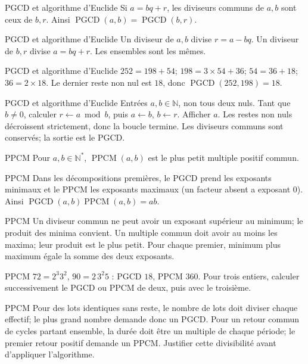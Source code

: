\documentclass[aspectratio=169,10pt]{beamer}
\begin{document}
\begin{frame}{PGCD et algorithme d’Euclide}
Si \(a=bq+r\), les diviseurs communs de \(a,b\) sont ceux de \(b,r\). Ainsi \(\operatorname{PGCD}(a,b)=\operatorname{PGCD}(b,r)\).
\end{frame}
\begin{frame}{PGCD et algorithme d’Euclide}
Un diviseur de \(a,b\) divise \(r=a-bq\). Un diviseur de \(b,r\) divise \(a=bq+r\). Les ensembles sont les mêmes.
\end{frame}
\begin{frame}{PGCD et algorithme d’Euclide}
\(252=198+54\); \(198=3\times54+36\); \(54=36+18\); \(36=2\times18\). Le dernier reste non nul est \(18\), donc \(\operatorname{PGCD}(252,198)=18\).
\end{frame}
\begin{frame}{PGCD et algorithme d’Euclide}
Entrées \(a,b\in\mathbb{N}\), non tous deux nuls. Tant que \(b\ne0\), calculer \(r\leftarrow a\bmod b\), puis \(a\leftarrow b\), \(b\leftarrow r\). Afficher \(a\). Les restes non nuls décroissent strictement, donc la boucle termine. Les diviseurs communs sont conservés; la sortie est le PGCD.
\end{frame}
\begin{frame}{PPCM}
Pour \(a,b\in\mathbb{N}^*\), \(\operatorname{PPCM}(a,b)\) est le plus petit multiple positif commun.
\end{frame}
\begin{frame}{PPCM}
Dans les décompositions premières, le PGCD prend les exposants minimaux et le PPCM les exposants maximaux (un facteur absent a exposant \(0\)). Ainsi \(\operatorname{PGCD}(a,b)\operatorname{PPCM}(a,b)=ab\).
\end{frame}
\begin{frame}{PPCM}
Un diviseur commun ne peut avoir un exposant supérieur au minimum; le produit des minima convient. Un multiple commun doit avoir au moins les maxima; leur produit est le plus petit. Pour chaque premier, minimum plus maximum égale la somme des deux exposants.
\end{frame}
\begin{frame}{PPCM}
\(72=2^3 3^2\), \(90=2\,3^2 5\) : PGCD \(18\), PPCM \(360\). Pour trois entiers, calculer successivement le PGCD ou PPCM de deux, puis avec le troisième.
\end{frame}
\begin{frame}{PPCM}
Pour des lots identiques sans reste, le nombre de lots doit diviser chaque effectif; le plus grand nombre demande donc un PGCD. Pour un retour commun de cycles partant ensemble, la durée doit être un multiple de chaque période; le premier retour positif demande un PPCM. Justifier cette divisibilité avant d’appliquer l’algorithme.
\end{frame}
\end{document}
